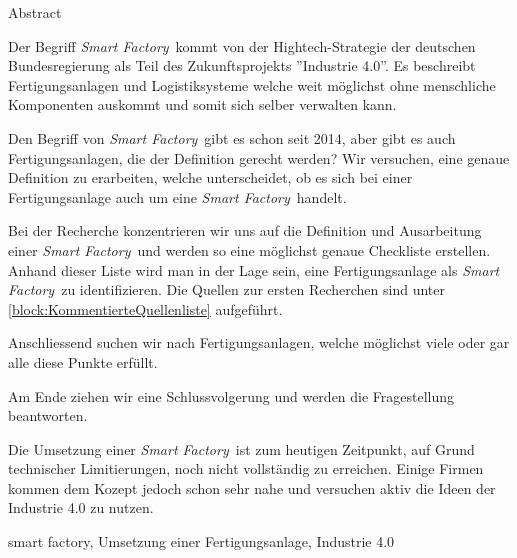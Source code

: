 \documentclass{article}
\def\SmartFactory{\textcolor{DarkestGray}{\textit{Smart Factory}}}
\begin{document}
\begin{Map}{Abstract}

Der Begriff \SmartFactory\ kommt von der Hightech-Strategie der deutschen Bundesregierung als Teil des Zukunftsprojekts ''Industrie 4.0''\cite{WasIndustrie40}. Es beschreibt Fertigungsanlagen und Logistiksysteme welche weit möglichst ohne menschliche Komponenten auskommt und somit sich selber verwalten kann\cite{Industrie40TippsUmsetzung}.

Den Begriff von \SmartFactory\ gibt es schon seit 2014, aber gibt es auch Fertigungsanlagen, die der Definition gerecht werden?
Wir versuchen, eine genaue Definition zu erarbeiten, welche unterscheidet, ob es sich bei einer Fertigungsanlage auch um eine \SmartFactory\ handelt.

Bei der Recherche konzentrieren wir uns auf die Definition und Ausarbeitung einer \SmartFactory\ und werden so eine möglichst genaue Checkliste erstellen. Anhand dieser Liste wird man in der Lage sein, eine Fertigungsanlage als \SmartFactory\ zu identifizieren. Die Quellen zur ersten Recherchen sind unter \ref{block:KommentierteQuellenliste} aufgeführt. \par

Anschliessend suchen wir nach Fertigungsanlagen, welche möglichst viele oder gar alle diese Punkte erfüllt. \par

Am Ende ziehen wir eine Schlussvolgerung und werden die Fragestellung beantworten.

Die Umsetzung einer \SmartFactory\ ist zum heutigen Zeitpunkt, auf Grund technischer Limitierungen, noch nicht vollständig zu erreichen.
Einige Firmen kommen dem Kozept jedoch schon sehr nahe und versuchen aktiv die Ideen der Industrie 4.0 zu nutzen.

smart factory, Umsetzung einer Fertigungsanlage, Industrie 4.0


\end{Map}
\end{document}

